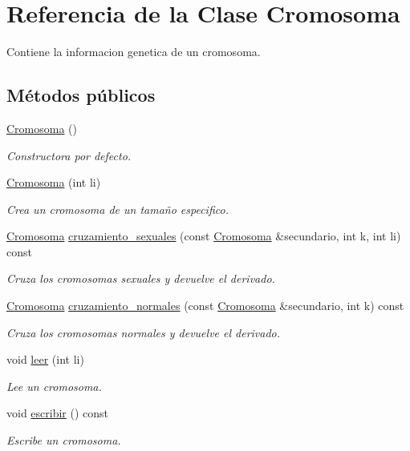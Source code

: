 \hypertarget{class_cromosoma}{}\section{Referencia de la Clase Cromosoma}
\label{class_cromosoma}


Contiene la informacion genetica de un cromosoma.  


\subsection*{Métodos públicos}
\begin{DoxyCompactItemize}
\item 
\hyperlink{class_cromosoma_a8367f3dd60c6af083aed533c69f17b29}{Cromosoma} ()
\begin{DoxyCompactList}\small\item\em Constructora por defecto. \end{DoxyCompactList}\item 
\hyperlink{class_cromosoma_a846b63ce7e4c4db0060336afd62a4d20}{Cromosoma} (int li)
\begin{DoxyCompactList}\small\item\em Crea un cromosoma de un tamaño especifico. \end{DoxyCompactList}\item 
\hyperlink{class_cromosoma}{Cromosoma} \hyperlink{class_cromosoma_a009c3b88b85d471334ba297593f6f907}{cruzamiento\+\_\+sexuales} (const \hyperlink{class_cromosoma}{Cromosoma} \&secundario, int k, int li) const
\begin{DoxyCompactList}\small\item\em Cruza los cromosomas sexuales y devuelve el derivado. \end{DoxyCompactList}\item 
\hyperlink{class_cromosoma}{Cromosoma} \hyperlink{class_cromosoma_a1ef5ef2cfc36fe9d414d3f5be0f6a2af}{cruzamiento\+\_\+normales} (const \hyperlink{class_cromosoma}{Cromosoma} \&secundario, int k) const
\begin{DoxyCompactList}\small\item\em Cruza los cromosomas normales y devuelve el derivado. \end{DoxyCompactList}\item 
void \hyperlink{class_cromosoma_abf3ef15e3f9af661572a768029e9c959}{leer} (int li)
\begin{DoxyCompactList}\small\item\em Lee un cromosoma. \end{DoxyCompactList}\item 
void \hyperlink{class_cromosoma_abc5487f92ef3cb6f982ddcfc63d77b47}{escribir} () const
\begin{DoxyCompactList}\small\item\em Escribe un cromosoma. \end{DoxyCompactList}\end{DoxyCompactItemize}


